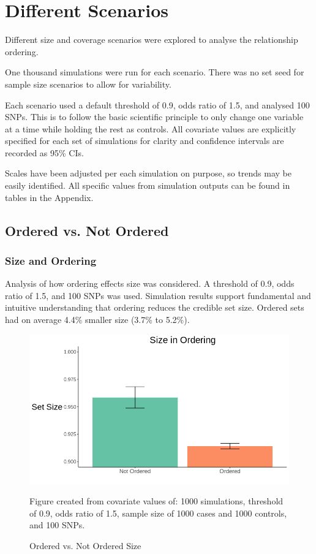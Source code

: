 \section{Different Scenarios} 

Different size and coverage scenarios were explored to analyse the relationship ordering. 

One thousand simulations were run for each scenario. There was no set seed for sample size scenarios to allow for variability. 

Each scenario used a default threshold of 0.9, odds ratio of 1.5, and analysed 100 SNPs. This is to follow the basic scientific principle to only change one variable at a time while holding the rest as controls. All covariate values are explicitly specified for each set of simulations for clarity and confidence intervals are recorded as 95\% CIs. 

Scales have been adjusted per each simulation on purpose, so trends may be easily identified. All specific values from simulation outputs can be found in tables in the Appendix. 






\subsection{Ordered vs. Not Ordered}
\subsubsection{Size and Ordering}
Analysis of how ordering effects size was considered. A threshold of 0.9, odds ratio of 1.5, and 100 SNPs was used. Simulation results support fundamental and intuitive understanding that ordering reduces the credible set size. Ordered sets had on average 4.4\% smaller size  (3.7\% to 5.2\%). 

\begin{figure}[H]
\centering
\includegraphics[scale=0.625]{images/Barplots/Ordered_Size.png}
\caption{Ordered vs. Not Ordered Size}
    \smallskip
    \footnotesize
Figure created from covariate values of: 1000 simulations, threshold of 0.9, odds ratio of 1.5, sample size of 1000 cases and 1000 controls, and 100 SNPs. 
\label{fig: Ordered_Size}
\end{figure}

